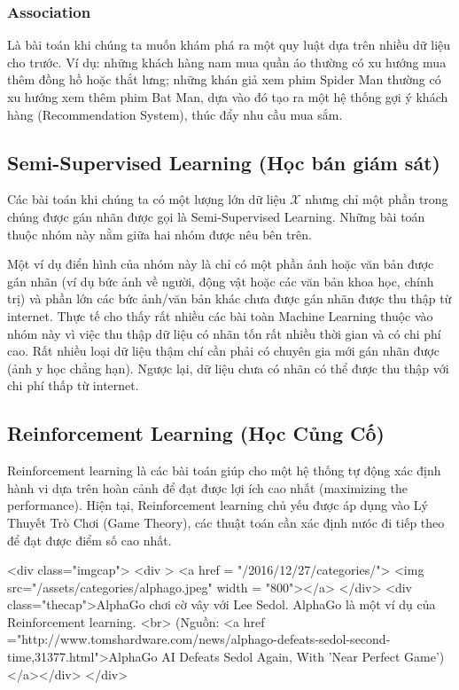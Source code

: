  
\subsubsection{Association}
Là bài toán khi chúng ta muốn khám phá ra một quy luật dựa trên nhiều dữ liệu cho trước. Ví dụ: những khách hàng nam mua quần áo thường có xu hướng mua thêm đồng hồ hoặc thắt lưng; những khán giả xem phim Spider Man thường có xu hướng xem thêm phim Bat Man, dựa vào đó tạo ra một hệ thống gợi ý khách hàng (Recommendation System), thúc đẩy nhu cầu mua sắm.  
 
 
\subsection{Semi-Supervised Learning (Học bán giám sát)}
Các bài toán khi chúng ta có một lượng lớn dữ liệu $\mathcal{X}$ nhưng chỉ một phần trong chúng được gán nhãn được gọi là Semi-Supervised Learning. Những bài toán thuộc nhóm này nằm giữa hai nhóm được nêu bên trên.  
 
Một ví dụ điển hình của nhóm này là chỉ có một phần ảnh hoặc văn bản được gán nhãn (ví dụ bức ảnh về người, động vật hoặc các văn bản khoa học, chính trị) và phần lớn các bức ảnh/văn bản khác chưa được gán nhãn được thu thập từ internet. Thực tế cho thấy rất nhiều các bài toàn Machine Learning thuộc vào nhóm này vì việc thu thập dữ liệu có nhãn tốn rất nhiều thời gian và có chi phí cao. Rất nhiều loại dữ liệu thậm chí cần phải có chuyên gia mới gán nhãn được (ảnh y học chẳng hạn). Ngược lại, dữ liệu chưa có nhãn có thể được thu thập với chi phí thấp từ internet.  
 
 
 
\subsection{Reinforcement Learning (Học Củng Cố)}
Reinforcement learning là các bài toán giúp cho một hệ thống tự động xác định hành vi dựa trên hoàn cảnh để đạt được lợi ích cao nhất (maximizing the performance). Hiện tại, Reinforcement learning chủ yếu được áp dụng vào Lý Thuyết Trò Chơi (Game Theory), các thuật toán cần xác định nưóc đi tiếp theo để đạt được điểm số cao nhất. 
 
<div class="imgcap"> 
<div > 
<a href = "/2016/12/27/categories/"> 
    <img src="/assets/categories/alphago.jpeg" width = "800"></a> 
</div> 
<div class="thecap">AlphaGo chơi cờ vây với Lee Sedol. AlphaGo là một ví dụ của Reinforcement learning. <br> (Nguồn: <a href ="http://www.tomshardware.com/news/alphago-defeats-sedol-second-time,31377.html">AlphaGo AI Defeats Sedol Again, With 'Near Perfect Game')</a></div> 
</div> 
 
